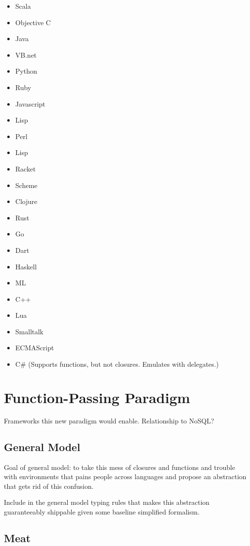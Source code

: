 \documentclass{llncs}
\begin{document}
\begin{itemize}
\item Scala
\item Objective C
\item Java
\item VB.net
\item Python
\item Ruby
\item Javascript
\item Lisp
\item Perl
\item Lisp
\item Racket
\item Scheme
\item Clojure
\item Rust
\item Go
\item Dart
\item Haskell
\item ML
\item C++
\item Lua
\item Smalltalk
\item ECMAScript
\item C\# (Supports functions, but not closures. Emulates with delegates.)
\end{itemize}

\section{Function-Passing Paradigm}

Frameworks this new paradigm would enable. Relationship to NoSQL?

\subsection{General Model}

Goal of general model: to take this mess of closures and functions and trouble with environments that pains people across languages and propose an abstraction that gets rid of this confusion.

Include in the general model typing rules that makes this abstraction guaranteeably shippable
given some baseline simplified formalism.

\subsection{Meat}
\end{document}
